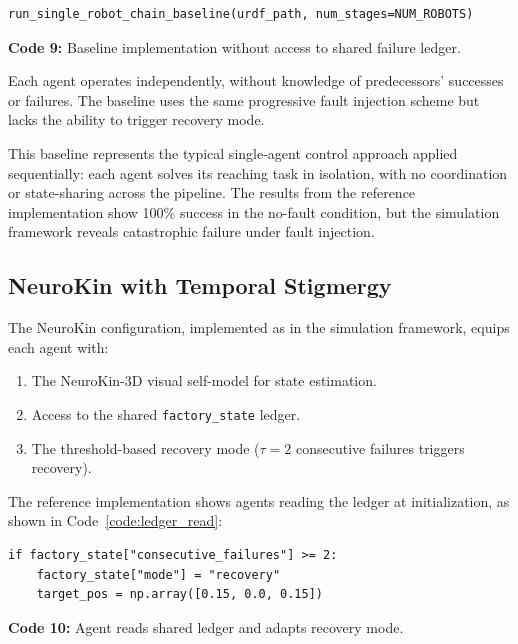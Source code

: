 \documentclass[12pt,a4paper,oneside]{report}
\begin{document}
{\small
\begin{verbatim}
run_single_robot_chain_baseline(urdf_path, num_stages=NUM_ROBOTS)
\end{verbatim}
}
\vspace{0.2cm}
{\small \textbf{Code 9:} Baseline implementation without access to shared failure ledger.\label{code:baseline_call}}
\vspace{0.3cm}

Each agent operates independently, without knowledge of predecessors' successes or failures. The baseline uses the same progressive fault injection scheme but lacks the ability to trigger recovery mode.

This baseline represents the typical single-agent control approach applied sequentially: each agent solves its reaching task in isolation, with no coordination or state-sharing across the pipeline. The results from the reference implementation show 100\% success in the no-fault condition, but the simulation framework reveals catastrophic failure under fault injection.

\subsection{NeuroKin with Temporal Stigmergy}
\label{subsec:neurokin_with_temporal_stigmergy}

The NeuroKin configuration, implemented as  in the simulation framework, equips each agent with:

\begin{enumerate}
    \item The NeuroKin-3D visual self-model for state estimation.
    \item Access to the shared \texttt{factory\_state} ledger.
    \item The threshold-based recovery mode ($\tau = 2$ consecutive failures triggers recovery).
\end{enumerate}

The reference implementation shows agents reading the ledger at initialization, as shown in Code~\ref{code:ledger_read}:

{\small
\begin{verbatim}
if factory_state["consecutive_failures"] >= 2:
    factory_state["mode"] = "recovery"
    target_pos = np.array([0.15, 0.0, 0.15])
\end{verbatim}
}
\vspace{0.2cm}
{\small \textbf{Code 10:} Agent reads shared ledger and adapts recovery mode.\label{code:ledger_read}}
\vspace{0.3cm}
\end{document}
